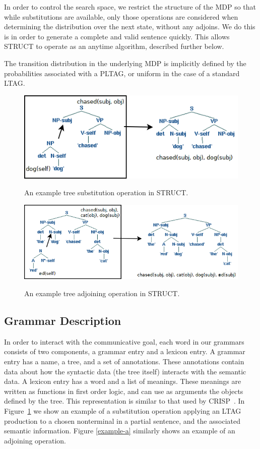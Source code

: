 In order to control the search space, we restrict the structure of the
MDP so that while substitutions are available, only those operations
are considered when determining the distribution over the next state,
without any adjoins.  We do this is in order to generate a
complete and valid sentence quickly.  This allows STRUCT to operate as
an anytime algorithm, described further below.

 The transition distribution in
 the underlying MDP is implicitly defined by the probabilities
 associated with a PLTAG, or uniform in the case of a standard LTAG.
\begin{figure}[t]
\centering
\includegraphics[width= 0.7 \linewidth]{sub-example.png}\label{examples-s}
\caption{An example tree substitution operation in STRUCT.}
\end{figure}

\begin{figure}[t]
\centering
\includegraphics[width= 0.7 \linewidth]{adjoin-example.png}\label{examples-a}
\caption{An example tree adjoining operation in STRUCT.}
\end{figure}

\subsection{Grammar Description}
 In order to interact with the communicative goal, each word in our
 grammars consists of two components, a grammar entry and a lexicon
 entry.  A grammar entry has a name, a tree, and a set of annotations.
 These annotations contain data about how the syntactic data (the tree
 itself) interacts with the semantic data.  A lexicon entry has a word
 and a list of meanings.  These meanings are written as functions in
 first order logic, and can use as arguments the objects defined by
 the tree. This representation is similar to that used by
 CRISP~\cite{koller_sentence_2007}. In Figure~\ref{examples-s}
  we show an example of a substitution operation applying an LTAG production to
 a chosen nonterminal in a partial sentence, and the associated
 semantic information.  Figure \ref{example-a} similarly shows an example
 of an adjoining operation.

